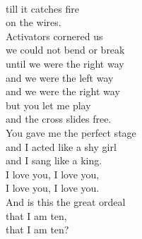 \documentclass[smalldemyvopaper,11pt,twoside,onecolumn,openright,extrafontsizes]{memoir}
\begin{document}
\\till it catches fire
\\on the wires.
\\Activators cornered us
\\we could not bend or break
\\until we were the right way
\\and we were the left way
\\and we were the right way
\\but you let me play
\\and the cross slides free.
\\You gave me the perfect stage
\\and I acted like a shy girl
\\and I sang like a king.
\\I love you, I love you,
\\I love you, I love you.
\\And is this the great ordeal
\\that I am ten,
\\that I am ten?
\end{document}
